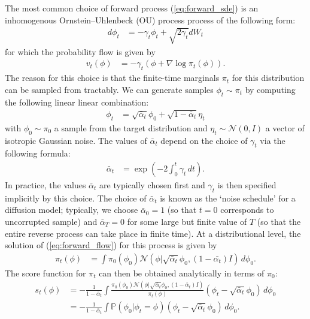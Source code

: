 \documentclass{article}
\theoremstyle{plain}
\theoremstyle{definition}
\theoremstyle{remark}
\begin{document}
The most common choice of forward process (\ref{eq:forward_sde}) is an inhomogenous Ornstein–Uhlenbeck (OU) process process of the following form:
\begin{align}
    d\phi_t &= -\gamma_t \phi_t + \sqrt{2 \gamma_t} dW_t
\end{align}
for which the probability flow is given by
\begin{align}
    v_t(\phi) &= -\gamma_t (\phi + \nabla \log \pi_t(\phi)).
\end{align}
The reason for this choice is that the finite-time marginals $\pi_t$ for this distribution can be sampled from tractably. We can generate samples $\phi_t \sim \pi_t$ by computing the following linear linear combination:
\begin{align}\label{eq:noise_interp}
    \phi_t &= \sqrt{\bar{\alpha}_t} \phi_0 + \sqrt{1 - \bar{\alpha}_t} \eta_t
\end{align}
with $\phi_0 \sim \pi_0$ a sample from the target distribution and $\eta_t \sim \mathcal{N}(0,I)$ a vector of isotropic Gaussian noise. The values of $\bar{\alpha}_t$ depend on the choice of $\gamma_t$ via the following formula:
\begin{align}
    \bar{\alpha}_t &= \exp(-2\int_0^t \gamma_t\,dt).
\end{align}
In practice, the values $\bar{\alpha}_t$ are typically chosen first and $\gamma_t$ is then specified implicitly by this choice. The choice of $\bar{\alpha}_t$ is known as the `noise schedule' for a diffusion model; typically, we choose $\bar{\alpha}_0 = 1$ (so that $t = 0$ corresponds to uncorrupted sample) and $\bar{\alpha}_T = 0$ for some large but finite value of $T$ (so that the entire reverse process can take place in finite time). At a distributional level, the solution of (\ref{eq:forward_flow}) for this process is given by
\begin{align}
    \pi_t(\phi) &= \int \pi_0(\phi_0) \mathcal{N}(\phi| \sqrt{\bar{\alpha}_t} \phi_0, (1 - \bar{\alpha_t}) I) \,d\phi_0.
\end{align}
The score function for $\pi_t$ can then be obtained analytically in terms of $\pi_0$:
\begin{equation}\label{eq:score_analytic}
\begin{split}
    s_t(\phi) &=  -\frac{1}{1 - \bar{\alpha}_t}\int \frac{\pi_0(\phi_0) \mathcal{N}(\phi | \sqrt{\bar{\alpha}_t} \phi_0 ,(1 - \bar{\alpha}_t) I)}{\pi_t(\phi)} (\phi_t - \sqrt{\bar{\alpha}_t} \phi_0)\,d\phi_0\\
    &= -\frac{1}{1 - \bar{\alpha}_t} \int \mathbb{P}(\phi_0|\phi_t=\phi) (\phi_t - \sqrt{\bar{\alpha}_t} \phi_0)\,d\phi_0.
\end{split}
\end{equation}
\end{document}
